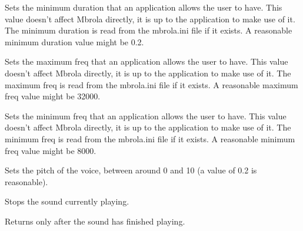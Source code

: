 \label{wxmbrolasetminduration}


Sets the minimum duration that an application allows the user to have. This value doesn't
affect Mbrola directly, it is up to the application to make use of it. The minimum
duration is read from the mbrola.ini file if it exists. A reasonable minimum duration value might be 0.2.

\label{wxmbrolasetmaxfreq}


Sets the maximum freq that an application allows the user to have. This value doesn't
affect Mbrola directly, it is up to the application to make use of it. The maximum
freq is read from the mbrola.ini file if it exists. A reasonable maximum freq value might be 32000.

\label{wxmbrolasetminfreq}


Sets the minimum freq that an application allows the user to have. This value doesn't
affect Mbrola directly, it is up to the application to make use of it. The minimum
freq is read from the mbrola.ini file if it exists. A reasonable minimum freq value might be 8000.

\label{wxmbrolasetpitch}


Sets the pitch of the voice, between around 0 and 10 (a value of 0.2 is reasonable).

\label{wxmbrolastop}


Stops the sound currently playing.

\label{wxmbrolawaitforend}


Returns only after the sound has finished playing.


